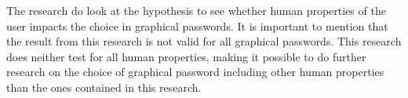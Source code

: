     The research do look at the hypothesis to see whether human properties of the user impacts the choice in graphical passwords. It is important to mention that the result from this research is not valid for all graphical passwords. This research does neither test for all human properties, making it possible to do further research on the choice of graphical password including other human properties than the ones contained in this research. 

